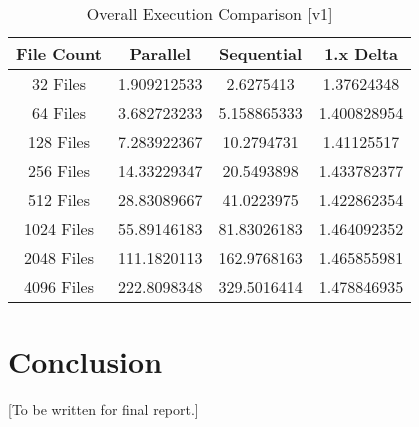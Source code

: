 \documentclass[report]{IEEEtran}
\begin{document}
\begin{table}[!t]
\renewcommand{\arraystretch}{1.3}
\caption{Overall Execution Comparison [v1]}
\label{ExecutionComparison}
\centering

\begin{tabular}{|c||c||c||c|}
\hline
File Count & Parallel & Sequential & 1.x Delta\\
\hline
32 Files & 1.909212533 & 2.6275413 & 1.37624348\\
\hline
64 Files & 3.682723233 & 5.158865333 & 1.400828954\\
\hline
128 Files & 7.283922367 & 10.2794731 & 1.41125517\\
\hline
256 Files & 14.33229347 & 20.5493898 & 1.433782377\\
\hline
512 Files & 28.83089667 & 41.0223975 & 1.422862354\\
\hline
1024 Files & 55.89146183 & 81.83026183 & 1.464092352\\
\hline
2048 Files & 111.1820113 & 162.9768163 & 1.465855981\\
\hline
4096 Files & 222.8098348 & 329.5016414 & 1.478846935\\
\hline
\end{tabular}
\end{table}

\section{Conclusion}
[To be written for final report.]



%
\end{document}
